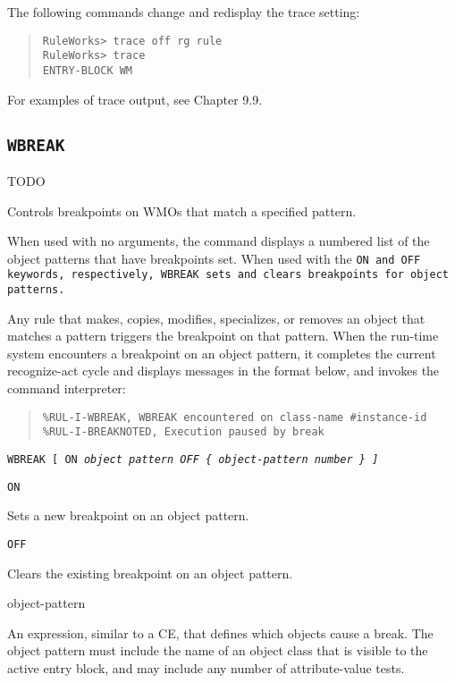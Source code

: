 {{The following commands change and redisplay the trace
setting:

\begin{quote}
\begin{verbatim}
RuleWorks> trace off rg rule
RuleWorks> trace
ENTRY-BLOCK WM
\end{verbatim}
\end{quote}  

For examples of trace output, see Chapter 9.9.

\subsection{\tt{WBREAK}}
TODO

Controls breakpoints on WMOs that match a specified pattern.

When used with no arguments, the command displays a numbered list of
the object patterns that have breakpoints set. When used with the
\tt{ON} and \tt{OFF} keywords, respectively, \tt{WBREAK} sets and
clears breakpoints for object patterns.

Any rule that makes, copies, modifies, specializes, or removes an
object that matches a pattern triggers the breakpoint on that
pattern. When the run-time system encounters a breakpoint on an object
pattern, it completes the current recognize-act cycle and displays
messages in the format below, and invokes the command interpreter:

\begin{quote}
\begin{verbatim}
%RUL-I-WBREAK, WBREAK encountered on class-name #instance-id
%RUL-I-BREAKNOTED, Execution paused by break
\end{verbatim}
\end{quote}

\Format

\tt{WBREAK} [ \tt{ON} \it{object pattern} \tt{OFF} \{
\it{object-pattern} \it{number} \tt* \} ]

\begin{arguments}
\item[\tt{ON}]

  Sets a new breakpoint on an object pattern.

\item[\tt{OFF}]

  Clears the existing breakpoint on an object pattern.

\item[object-pattern]

  An expression, similar to a CE, that defines which objects cause a
  break. The object pattern must include the name of an object class
  that is visible to the active entry block, and may include any
  number of attribute-value tests.


\end{arguments}}}
